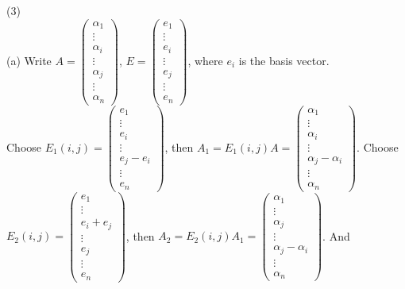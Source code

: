 \documentclass[12pt]{article}
\begin{document}
\medskip
(3)\\
\medskip
(a)
Write $A = \begin{pmatrix}
\alpha_1 \\
\vdots \\
\alpha_i \\
\vdots \\
\alpha_j \\
\vdots \\
\alpha_n
\end{pmatrix}$, $E = \begin{pmatrix}
e_1 \\
\vdots \\
e_i \\
\vdots \\
e_j \\
\vdots \\
e_n
\end{pmatrix}$, where $e_i$ is the basis vector. \\
Choose $E_1(i,j) = \begin{pmatrix}
e_1 \\
\vdots \\
e_i \\
\vdots \\
e_j - e_i \\
\vdots \\
e_n
\end{pmatrix}$, then $A_1 = E_1(i,j) A =  \begin{pmatrix}
\alpha_1 \\
\vdots \\
\alpha_i \\
\vdots \\
\alpha_j - \alpha_i\\
\vdots \\
\alpha_n
\end{pmatrix}$.
Choose $E_2(i,j) = \begin{pmatrix}
e_1 \\
\vdots \\
e_i + e_j\\
\vdots \\
e_j  \\
\vdots \\
e_n
\end{pmatrix}$, then $A_2 = E_2(i,j) A_1 = \begin{pmatrix}
\alpha_1 \\
\vdots \\
\alpha_j \\
\vdots \\
\alpha_j - \alpha_i\\
\vdots \\
\alpha_n
\end{pmatrix}$. And 
\end{document}
